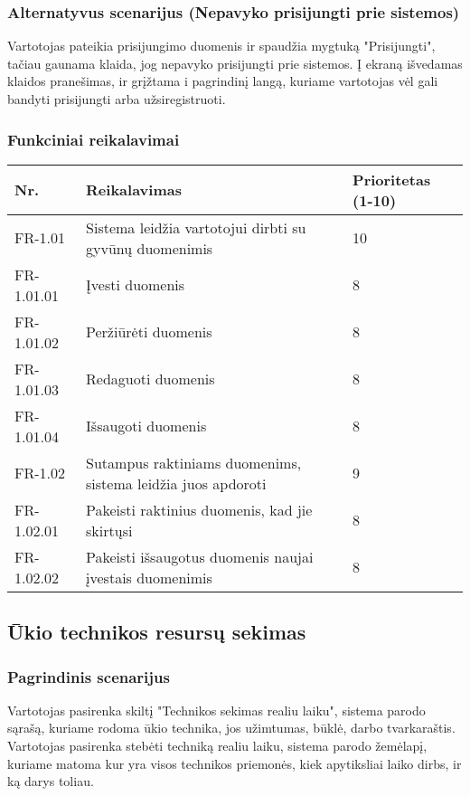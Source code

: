 \documentclass[oneside]{VUMIFPSkursinis}
\begin{document}
\subsubsection{Alternatyvus scenarijus (Nepavyko prisijungti prie sistemos)}
	Vartotojas pateikia prisijungimo duomenis ir spaudžia mygtuką "Prisijungti", tačiau gaunama klaida, jog nepavyko prisijungti prie sistemos. Į ekraną išvedamas klaidos pranešimas, ir grįžtama i pagrindinį langą, kuriame vartotojas vėl gali bandyti prisijungti arba užsiregistruoti.
\subsubsection{Funkciniai reikalavimai}
\begin{table}[htbp]
	\begin{tabularx}{1\textwidth}{ |P{2.5cm}|X|P{3cm }| } \hline
           	Nr. & Reikalavimas &  Prioritetas (1-10)  \\   \hline 
         	FR-1.01 & Sistema leidžia vartotojui dirbti su gyvūnų duomenimis & 10  \\   \hline
		FR-1.01.01 & Įvesti duomenis & 8 \\ \hline
		FR-1.01.02 & Peržiūrėti duomenis & 8 \\ \hline
		FR-1.01.03 & Redaguoti duomenis & 8 \\ \hline
		FR-1.01.04 & Išsaugoti duomenis & 8 \\ \hline
        	FR-1.02 & Sutampus raktiniams duomenims, sistema leidžia juos apdoroti & 9   \\   \hline
		FR-1.02.01 & Pakeisti raktinius duomenis, kad jie skirtųsi & 8 \\ \hline
		FR-1.02.02 & Pakeisti išsaugotus duomenis naujai įvestais duomenimis & 8 \\ \hline
	\end{tabularx}
\end{table}

\subsection{Ūkio technikos resursų sekimas}
\subsubsection{Pagrindinis scenarijus}
	Vartotojas pasirenka skiltį "Technikos sekimas realiu laiku", sistema parodo sąrašą, kuriame rodoma ūkio technika, jos užimtumas, būklė, darbo tvarkaraštis. Vartotojas pasirenka stebėti techniką realiu laiku, sistema parodo žemėlapį, kuriame matoma kur yra visos technikos priemonės, kiek apytiksliai laiko dirbs, ir ką darys toliau.
\end{document}
